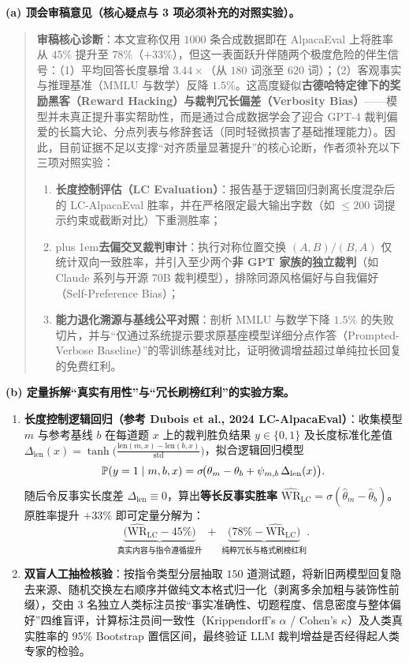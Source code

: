 \textbf{(a) 顶会审稿意见（核心疑点与 3 项必须补充的对照实验）。}
\begin{quote}
\small
\textbf{审稿核心诊断}：本文宣称仅用 $1000$ 条合成数据即在 AlpacaEval 上将胜率从 $45\%$ 提升至 $78\%$（$+33\%$），但这一表面跃升伴随两个极度危险的伴生信号：（1）平均回答长度暴增 $3.44\times$（从 $180$ 词涨至 $620$ 词）；（2）客观事实与推理基准（MMLU 与数学）反降 $1.5\%$。这高度疑似\textbf{古德哈特定律下的奖励黑客（Reward Hacking）与裁判冗长偏差（Verbosity Bias）}——模型并未真正提升事实帮助性，而是通过合成数据学会了迎合 GPT-4 裁判偏爱的长篇大论、分点列表与修辞套话（同时轻微损害了基础推理能力）。因此，目前证据不足以支撑“对齐质量显著提升”的核心论断，作者须补充以下三项对照实验：
\begin{enumerate}
  \item \textbf{长度控制评估（LC Evaluation）}：报告基于逻辑回归剥离长度混杂后的 LC-AlpacaEval 胜率，并在严格限定最大输出字数（如 $\le 200$ 词提示约束或截断对比）下重测胜率；
  \item {\rightskip=0pt plus 1em\relax \textbf{去偏交叉裁判审计}：执行对称位置交换 $(A,B)/(B,A)$ 仅统计双向一致胜率，并引入至少两个\textbf{非 GPT 家族的独立裁判}（如 Claude 系列与开源 70B 裁判模型），排除同源风格偏好与自我偏好（Self-Preference Bias）；\par}
  \item \textbf{能力退化溯源与基线公平对照}：剖析 MMLU 与数学下降 $1.5\%$ 的失败切片，并与“仅通过系统提示要求原基座模型详细分点作答（Prompted-Verbose Baseline）”的零训练基线对比，证明微调增益超过单纯拉长回复的免费红利。
\end{enumerate}
\end{quote}

\textbf{(b) 定量拆解“真实有用性”与“冗长刷榜红利”的实验方案。}
\begin{enumerate}
  \item \textbf{长度控制逻辑回归（参考 Dubois et al., 2024 LC-AlpacaEval）}：收集模型 $m$ 与参考基线 $b$ 在每道题 $x$ 上的裁判胜负结果 $y \in \{0, 1\}$ 及长度标准化差值 $\Delta_{\text{len}}(x) = \tanh\!\big(\frac{\text{len}(m,x) - \text{len}(b,x)}{\text{std}}\big)$，拟合逻辑回归模型
  \[
    \mathbb{P}(y = 1 \mid m, b, x) = \sigma\!\big(\theta_m - \theta_b + \psi_{m,b}\,\Delta_{\text{len}}(x)\big).
  \]
  随后令反事实长度差 $\Delta_{\text{len}} \equiv 0$，算出\textbf{等长反事实胜率} $\widehat{\mathrm{WR}}_{\text{LC}} = \sigma(\hat{\theta}_m - \hat{\theta}_b)$。原胜率提升 $+33\%$ 即可定量分解为：
  \[
    \underbrace{\big(\widehat{\mathrm{WR}}_{\text{LC}} - 45\%\big)}_{\text{真实内容与指令遵循提升}}
    \;+\;
    \underbrace{\big(78\% - \widehat{\mathrm{WR}}_{\text{LC}}\big)}_{\text{纯粹冗长与格式刷榜红利}}.
  \]
  \item \textbf{双盲人工抽检核验}：按指令类型分层抽取 $150$ 道测试题，将新旧两模型回复隐去来源、随机交换左右顺序并做纯文本格式归一化（剥离多余加粗与装饰性前缀），交由 $3$ 名独立人类标注员按“事实准确性、切题程度、信息密度与整体偏好”四维盲评，计算标注员间一致性（Krippendorff's $\alpha$ / Cohen's $\kappa$）及人类真实胜率的 $95\%$ Bootstrap 置信区间，最终验证 LLM 裁判增益是否经得起人类专家的检验。
\end{enumerate}

